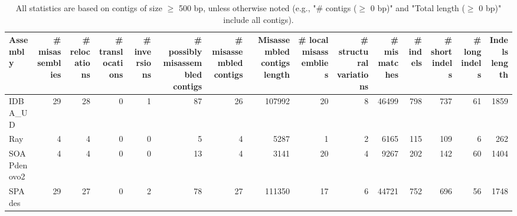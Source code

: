 \documentclass[12pt,a4paper]{article}
\begin{document}
\begin{table}[ht]
\begin{center}
\caption{All statistics are based on contigs of size $\geq$ 500 bp, unless otherwise noted (e.g., "\# contigs ($\geq$ 0 bp)" and "Total length ($\geq$ 0 bp)" include all contigs).}
\begin{tabular}{|l*{14}{|r}|}
\hline
Assembly & \# misassemblies &     \# relocations &     \# translocations &     \# inversions & \# possibly misassembled contigs & \# misassembled contigs & Misassembled contigs length & \# local misassemblies & \# structural variations & \# mismatches & \# indels &     \# short indels &     \# long indels & Indels length \\ \hline
IDBA\_UD & 29 & 28 & 0 & 1 & 87 & 26 & 107992 & 20 & 8 & 46499 & 798 & 737 & 61 & 1859 \\ \hline
Ray & 4 & 4 & 0 & 0 & 5 & 4 & 5287 & 1 & 2 & 6165 & 115 & 109 & 6 & 262 \\ \hline
SOAPdenovo2 & 4 & 4 & 0 & 0 & 13 & 4 & 3141 & 20 & 4 & 9267 & 202 & 142 & 60 & 1404 \\ \hline
SPAdes & 29 & 27 & 0 & 2 & 78 & 27 & 111350 & 17 & 6 & 44721 & 752 & 696 & 56 & 1748 \\ \hline
\end{tabular}
\end{center}
\end{table}
\end{document}
